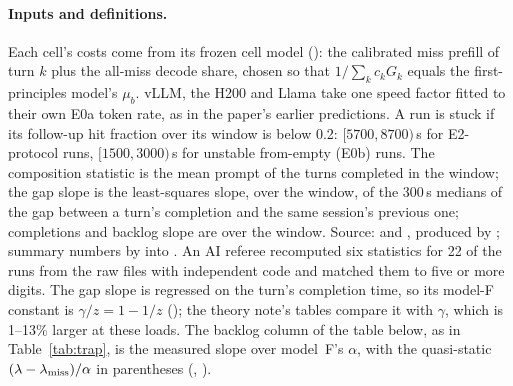 \paragraph{Inputs and definitions.} Each cell's costs come from its frozen cell model (): the
calibrated miss prefill of turn $k$ plus the all-miss decode share, chosen so that $1/\sum_kc_kG_k$ equals the first-principles
model's $\mu_b$. vLLM, the H200 and Llama take one speed factor fitted to their own E0a token rate, as in the paper's earlier
predictions. A run is stuck if its follow-up hit fraction over its window is below 0.2: $[5700,8700)$\,s for E2-protocol runs,
$[1500,3000)$\,s for unstable from-empty (E0b) runs. The composition statistic is the mean prompt of the turns completed in the
window; the gap slope is the least-squares slope, over the window, of the 300\,s medians of the gap between a turn's completion
and the same session's previous one; completions and backlog slope are over the window. Source:
 and , produced by ; summary
numbers by  into . An AI referee recomputed six statistics for 22 of the runs from the raw
files with independent code and matched them to five or more digits. The gap slope is regressed on the turn's completion time,
so its model-F constant is $\gamma/z=1-1/z$ (); the theory note's tables
compare it with $\gamma$, which is 1--13\% larger at these loads. The backlog column of the table below, as in
Table~\ref{tab:trap}, is the measured slope over model~F's $\alpha$, with the quasi-static $(\lambda-\lambda_{\mathrm{miss}})/\alpha$ in parentheses
(, ).

